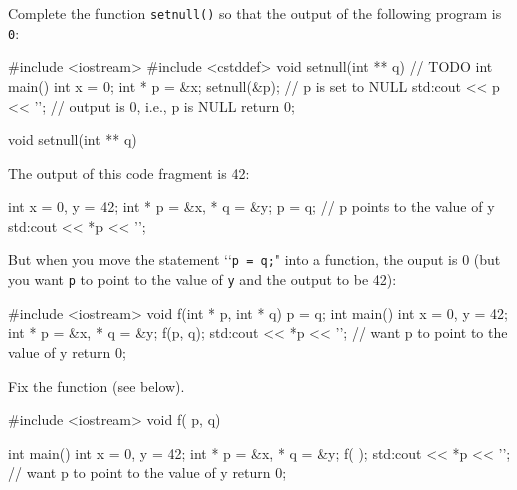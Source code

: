 

\nextq
Complete the function \verb!setnull()! so that the output
of the following program is \verb!0!:
\begin{console}[fontsize=\small]
#include <iostream>
#include <cstddef>
void setnull(int ** q)
{
    // TODO
}
int main()
{
    int x = 0;
    int * p = &x;
    setnull(&p);           // p is set to NULL
    std:cout << p << '\n'; // output is 0, i.e., p is NULL
    return 0;
}
\end{console}
\ANSWER
\begin{answercode}
void setnull(int ** q)
{

}
\end{answercode}

\newpage
\nextq
The output of this code fragment is 42:
\begin{console}[fontsize=\small]
int x = 0, y = 42;
int * p = &x, * q = &y;
p = q;                  // p points to the value of y
std:cout << *p << '\n';
\end{console}
But when you move the statement \lq\lq \verb!p = q;!" into a function,
the ouput is 0 (but you want \verb!p! to point to the value of \verb!y!
and the output to be 42):
\begin{console}[fontsize=\small]
#include <iostream>
void f(int * p, int * q)
{
    p = q;
}
int main()
{
    int x = 0, y = 42;
    int * p = &x, * q = &y;
    f(p, q);
    std:cout << *p << '\n'; // want p to point to the value of y
    return 0;
}
\end{console}
Fix the function (see below).
\\ \ANSWER
\begin{answercode}
#include <iostream>
void f(       p,        q)
{

}
int main()
{
    int x = 0, y = 42;
    int * p = &x, * q = &y;
    f(         );
    std:cout << *p << '\n'; // want p to point to the value of y
    return 0;
}
\end{answercode}

